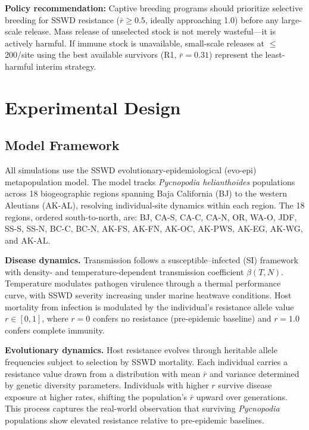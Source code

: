 \documentclass[11pt,a4paper]{article}
\newcommand{\rbar}{\ensuremath{\bar{r}}}
\begin{document}
\medskip
\textbf{Policy recommendation:} Captive breeding programs should prioritize selective breeding for SSWD resistance ($\rbar \geq 0.5$, ideally approaching 1.0) before any large-scale release. Mass release of unselected stock is not merely wasteful---it is actively harmful. If immune stock is unavailable, small-scale releases at $\leq$200/site using the best available survivors (R1, $\rbar=0.31$) represent the least-harmful interim strategy.


\section{Experimental Design}

\subsection{Model Framework}

All simulations use the SSWD evolutionary-epidemiological (evo-epi) metapopulation model. The model tracks \textit{Pycnopodia helianthoides} populations across 18 biogeographic regions spanning Baja California (BJ) to the western Aleutians (AK-AL), resolving individual-site dynamics within each region. The 18 regions, ordered south-to-north, are: BJ, CA-S, CA-C, CA-N, OR, WA-O, JDF, SS-S, SS-N, BC-C, BC-N, AK-FS, AK-FN, AK-OC, AK-PWS, AK-EG, AK-WG, and AK-AL.

\textbf{Disease dynamics.} Transmission follows a susceptible--infected (SI) framework with density- and temperature-dependent transmission coefficient $\beta(T, N)$. Temperature modulates pathogen virulence through a thermal performance curve, with SSWD severity increasing under marine heatwave conditions. Host mortality from infection is modulated by the individual's resistance allele value $r \in [0,1]$, where $r=0$ confers no resistance (pre-epidemic baseline) and $r=1.0$ confers complete immunity.

\textbf{Evolutionary dynamics.} Host resistance evolves through heritable allele frequencies subject to selection by SSWD mortality. Each individual carries a resistance value drawn from a distribution with mean $\rbar$ and variance determined by genetic diversity parameters. Individuals with higher $r$ survive disease exposure at higher rates, shifting the population's $\rbar$ upward over generations. This process captures the real-world observation that surviving \textit{Pycnopodia} populations show elevated resistance relative to pre-epidemic baselines.
\end{document}
